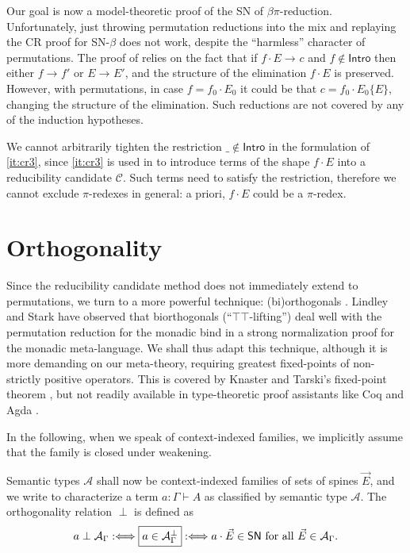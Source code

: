 \documentclass[a4paper,USenglish,cleveref, autoref, thm-restate]{lipics-v2021}
\newcommand{\defiff}{\mathrel{{{:}{\Longleftrightarrow}}}}
\newcommand{\red}[1][]{\longrightarrow_{#1}}
\newcommand{\A}{\mathcal{A}}
\newcommand{\C}{\mathcal{C}}
\newcommand{\SN}{\mathsf{SN}}
\newcommand{\Intro}{\mathsf{Intro}}
\begin{document}
Our goal is now a model-theoretic proof of the SN of $\beta\pi$-reduction.
Unfortunately,
just throwing permutation reductions into the mix and replaying the CR
proof for SN-$\beta$ does not work,
despite the ``harmless'' character of permutations.
The proof of  relies
on the fact that if $f \cdot E \red c$ and $f \not\in \Intro$ then
either $f \red f'$ or $E \red E'$, and the structure of the
elimination $f \cdot E$ is preserved.  However, with permutations, in
case $f = f_0 \cdot E_0$ it could be that $c = f_0 \cdot E_0\{E\}$,
changing the structure of the elimination.
Such reductions are not covered by any of the induction hypotheses.

We cannot arbitrarily tighten the restriction $\_ \not\in \Intro$ in
the formulation of \ref{it:cr3}, since \ref{it:cr3} is used in  to
introduce terms of the shape $f \cdot E$
into a reducibility candidate $\C$.  Such terms need to satisfy the
restriction, therefore we cannot exclude $\pi$-redexes in general: a
priori, $f \cdot E$ could be a $\pi$-redex.

\section{Orthogonality}
\label{sec:biortho}
\label{sec:ortho}

Since the reducibility candidate method does not immediately extend to
permutations, we turn to a more powerful technique: (bi)orthogonals
\cite{birkhoff:latticeTheory,pitts:mscs00,danosKrivine:csl00,girard:locusSolum,vouillonMellies:semanticTypes,abel:PhD}.
Lindley and Stark \cite{lindleyStark:tlca05} have observed that
biorthogonals (``$\top\top$-lifting'') deal well with the permutation
reduction for the monadic bind in a strong normalization proof for the
monadic meta-language.  We shall thus adapt this technique, although
it is more demanding on our meta-theory, requiring greatest
fixed-points of non-strictly positive operators.  This is covered by
Knaster and Tarski's fixed-point theorem \cite{tarski:fixpoint}, but
not readily available in type-theoretic proof assistants like Coq
\cite{coq:8120} and
Agda \cite{agda:261}.

In the following, when we speak of context-indexed families, we
implicitly assume that the family is closed under weakening.

Semantic types $\A$ shall now be context-indexed families of sets of
spines $\vec E$, and we write \fbox{$a \perp \A_\Gamma$} to
characterize a term $a : \Gamma \vdash A$ as classified by semantic
type $\A$.  The orthogonality relation $\perp$ is defined as
\[
  a \perp \A_\Gamma \defiff
  \fbox{$a \in \A_\Gamma^\perp$} \defiff
  a \cdot \vec E \in \SN \mbox{ for all } \vec E \in \A_\Gamma
  .
\]
\end{document}
